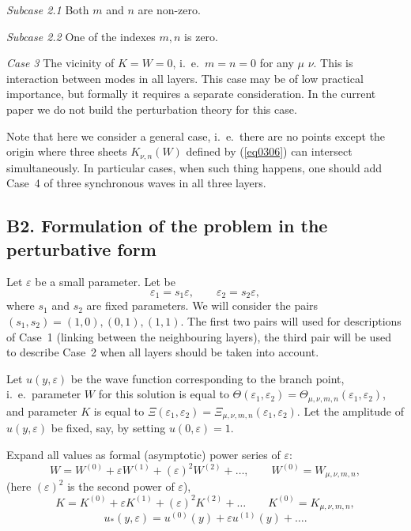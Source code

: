 \documentclass[12pt]{article}
\newcommand{\eps}{\varepsilon}
\begin{document}
{\em Subcase 2.1}
Both $m$ and $n$ are non-zero.

{\em Subcase 2.2}
One of the indexes $m,n$ is zero.


{\em Case 3}  
The vicinity of $K=W=0$, i.~e.\ $m = n = 0$ for any $\mu$ $\nu$. This is interaction between 
modes in all layers. This case may be of low practical importance, but formally it requires a separate consideration. In the current paper we do not build the perturbation theory for this 
case. 

Note that here we consider a general case, i.~e.\ there are no points except the origin 
where three sheets $K_{\nu ,n} (W)$ defined by (\ref{eq0306}) can intersect simultaneously.
In particular cases, when such thing happens, one should add Case~4 of three synchronous waves in all three layers. 


\subsection*{B2. Formulation of the problem in the perturbative form}

Let $\eps$ be a small parameter. Let be
\begin{equation}
\eps_1 = s_1\eps , \qquad \eps_2 = s_2 \eps,
\label{eqB01}
\end{equation} 
where $s_1$ and $s_2$ are fixed parameters. We will consider the pairs $(s_1 , s_2) = 
(1,0), (0,1), (1,1)$. The first two pairs will used for descriptions of Case~1 (linking between the neighbouring layers), the third pair will be used to describe Case~2
when all layers should be taken into account.  

Let $u(y, \eps)$ be the wave function corresponding to the branch point, i.~e.\
parameter $W$ for this solution is equal to 
$\Theta (\eps_1 , \eps_2) = \Theta_{\mu,\nu, m,n} (\eps_1, \eps_2)$, and 
parameter $K$ is equal to $\Xi (\eps_1 , \eps_2) = \Xi_{\mu,\nu,m,n} (\eps_1, \eps_2)$. 
Let the amplitude of $u(y, \eps)$ be fixed, say, by setting $u(0,\eps) =1$.

Expand all values as formal (asymptotic) power series of $\eps$: 
\begin{equation}
W = W^{(0)} + \eps W^{(1)} + (\eps)^2 W^{(2)} + \dots,
\qquad 
W^{(0)} = W_{\mu, \nu ,m,n} , 
\label{eqB02}
\end{equation}
(here $(\eps)^2$ is the second power of $\eps$), 
\begin{equation}
K = K^{(0)} + \eps K^{(1)} + (\eps)^2 K^{(2)} + \dots
\qquad 
K^{(0)} = K_{\mu, \nu,m,n},
\label{eqB03}
\end{equation}
\begin{equation}
u_* (y, \eps) = u^{(0)} (y) + \eps u^{(1)} (y)  +  \dots.   
\label{eqB04}
\end{equation}
   
\end{document}
